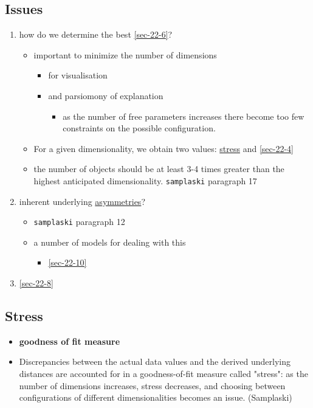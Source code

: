 \documentclass[11pt]{article}
\begin{document}
{{\subsection{Issues}
\label{sec-22-2}
\begin{enumerate}
\item how do we determine the best \ref{sec-22-6}?
\begin{itemize}
\item important to minimize the number of dimensions
\begin{itemize}
\item for visualisation
\item and parsiomony of explanation
\begin{itemize}
\item as the number of free parameters increases there become
too few constraints on the possible configuration.
\end{itemize}
\end{itemize}
\item For a given dimensionality, we obtain two values: \hyperref[sec-22-3]{stress} and
         \ref{sec-22-4}
\item the number of objects should be at least 3-4 times greater
than the highest anticipated dimensionality. \texttt{samplaski}
paragraph 17
\end{itemize}
\item inherent underlying \hyperref[sec-22-7]{asymmetries}?
\begin{itemize}
\item \texttt{samplaski} paragraph 12
\item a number of models for dealing with this
\begin{itemize}
\item \ref{sec-22-10}
\end{itemize}
\end{itemize}
\item \ref{sec-22-8}
\end{enumerate}

\subsection{Stress}
\label{sec-22-3}
\begin{itemize}
\item \textbf{goodness of fit measure}
\item Discrepancies between the actual data values and the derived
underlying distances are accounted for in a goodness-of-fit
measure called "stress": as the number of dimensions increases,
stress decreases, and choosing between configurations of
different dimensionalities becomes an issue. (Samplaski)
\end{itemize}

}}
\end{document}
